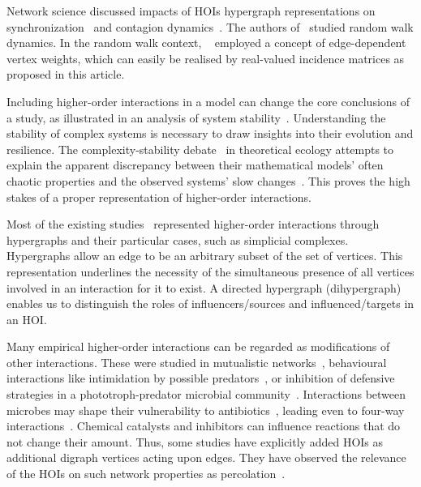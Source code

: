\documentclass[a4paper,12pt]{article}
\theoremstyle{definition}
\theoremstyle{remark}
\begin{document}
    Network science discussed impacts of HOIs hypergraph representations on synchronization~\cite{42_Millán_2019, 43_Skardal_2019, 44_Zhang_2021, 45_Mulas_2020} and contagion dynamics~\cite{47_St-Onge_2021, 48_Arruda_2020, 49_Iacopini_2018, 50_Arruda_2020, 51_Sun_2021, 52_Taylor_2015}. The authors of~\cite{46_random_walk_Carletti_2020} studied random walk dynamics. In the random walk context, ~\cite{Rnd_walk_edge_vertex_weights} employed a concept of edge-dependent vertex weights, which can easily be realised by real-valued incidence matrices as proposed in this article.
    

    

    Including higher-order interactions in a model can change the core conclusions of a study, as illustrated in an analysis of system stability~\cite{Grilli2017}. Understanding the stability of complex systems is necessary to draw insights into their evolution and resilience. The complexity-stability debate~\cite{Landi2018} in theoretical ecology attempts to explain the apparent discrepancy between their mathematical models' often chaotic properties and the observed systems' slow changes~\cite{May1972}. This proves the high stakes of a proper representation of higher-order interactions. 

    Most of the existing studies~\cite{GOLUBSKI2016344, BATTISTON20201, hoi_book} represented higher-order interactions through hypergraphs and their particular cases, such as simplicial complexes. Hypergraphs allow an edge to be an arbitrary subset of the set of vertices. This representation underlines the necessity of the simultaneous presence of all vertices involved in an interaction for it to exist. A directed hypergraph (dihypergraph) enables us to distinguish the roles of influencers/sources and influenced/targets in an HOI.


    Many empirical higher-order interactions can be regarded as modifications of other interactions. These were studied in mutualistic networks~\cite{Vandermeer_2010, Perfecto_coffe_agroeco, GOLUBSKI2016344}, behavioural interactions like intimidation by possible predators~\cite{preisser_intimidation}, or inhibition of defensive strategies in a phototroph-predator microbial community~\cite{Mickalide_microbial}. Interactions between microbes may shape their vulnerability to antibiotics~\cite{bac_31_kelsic2015counteraction, bac_32_perlin2009protection, bac_33_abrudan2015socially}, leading even to four-way interactions~\cite{bac_34_reading1977clavulanic}. Chemical catalysts and inhibitors can influence reactions that do not change their amount. Thus, some studies have explicitly added HOIs as additional digraph vertices acting upon edges. They have observed the relevance of the HOIs on such network properties as percolation~\cite{Sun_2023_triadic_Bianconi}. 
    
\end{document}
